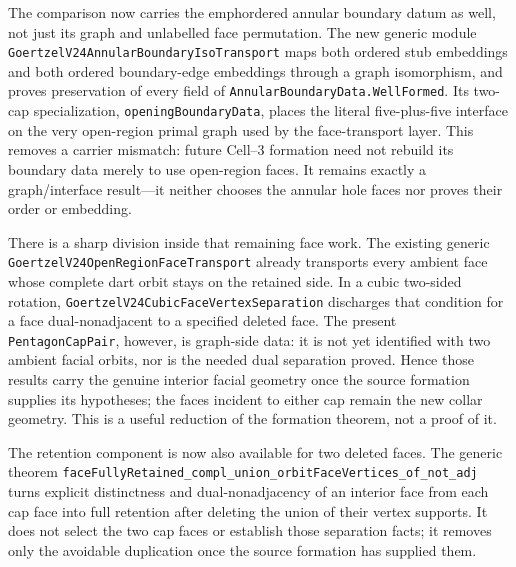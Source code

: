 \documentclass[11pt]{article}
\theoremstyle{definition}
\begin{document}
The comparison now carries the emph{ordered annular boundary datum} as well,
not just its graph and unlabelled face permutation.  The new generic module
\texttt{GoertzelV24AnnularBoundaryIsoTransport} maps both ordered stub
embeddings and both ordered boundary-edge embeddings through a graph
isomorphism, and proves preservation of every field of
\texttt{AnnularBoundaryData.WellFormed}.  Its two-cap specialization,
\texttt{openingBoundaryData}, places the literal five-plus-five interface on
the very open-region primal graph used by the face-transport layer.  This
removes a carrier mismatch: future Cell--3 formation need not rebuild its
boundary data merely to use open-region faces.  It remains exactly a
graph/interface result---it neither chooses the annular hole faces nor proves
their order or embedding.

There is a sharp division inside that remaining face work.  The existing
generic \texttt{GoertzelV24OpenRegionFaceTransport} already transports every
ambient face whose complete dart orbit stays on the retained side.  In a cubic
two-sided rotation, \texttt{GoertzelV24CubicFaceVertexSeparation} discharges
that condition for a face dual-nonadjacent to a specified deleted face.  The
present \texttt{PentagonCapPair}, however, is graph-side data: it is not yet
identified with two ambient facial orbits, nor is the needed dual separation
proved.  Hence those results carry the genuine interior facial geometry once
the source formation supplies its hypotheses; the faces incident to either
cap remain the new collar geometry.  This is a useful reduction of the
formation theorem, not a proof of it.

The retention component is now also available for two deleted faces.  The
generic theorem
\texttt{faceFullyRetained\_compl\_union\_orbitFaceVertices\_of\_not\_adj}
turns explicit distinctness and dual-nonadjacency of an interior face from
each cap face into full retention after deleting the union of their vertex
supports.  It does not select the two cap faces or establish those separation
facts; it removes only the avoidable duplication once the source formation
has supplied them.
\end{document}
